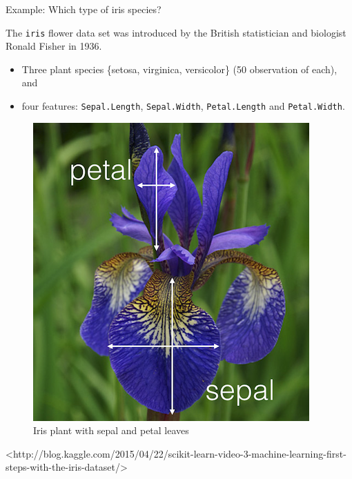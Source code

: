 \documentclass[10pt,ignorenonframetext,]{beamer}
\providecommand{\tightlist}{%
  \setlength{\itemsep}{0pt}\setlength{\parskip}{0pt}}
\begin{document}
\begin{frame}[fragile]

\begin{block}{Example: Which type of iris species?}

\vspace{2mm}

The \texttt{iris} flower data set was introduced by the British
statistician and biologist Ronald Fisher in 1936.

\begin{itemize}
\tightlist
\item
  Three plant species \{setosa, virginica, versicolor\} (50 observation
  of each), and
\item
  four features: \texttt{Sepal.Length}, \texttt{Sepal.Width},
  \texttt{Petal.Length} and \texttt{Petal.Width}.
\end{itemize}

\begin{figure}
\includegraphics[width=0.3\linewidth]{iris} \caption{Iris plant with sepal and petal leaves}\label{fig:iris_pic}
\end{figure}

\scriptsize
<http://blog.kaggle.com/2015/04/22/scikit-learn-video-3-machine-learning-first-steps-with-the-iris-dataset/>

\end{block}

\end{frame}
\end{document}

